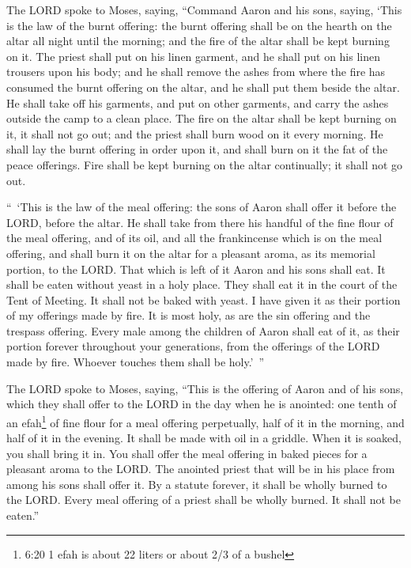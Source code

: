 \myverse{}The LORD spoke to Moses, saying,
\myverse{}“Command Aaron and his sons, saying, ‘This is the law of the burnt offering:
the burnt offering shall be on the hearth on the altar all night until the morning; and the fire of the
altar shall be kept burning on it.
\myverse{}The priest shall put on his linen garment, and he shall put on his linen trousers
upon his body; and he shall remove the ashes from where the fire has consumed the burnt offering on the
altar, and he shall put them beside the altar.
\myverse{}He shall take off his garments, and put on other garments, and carry the ashes
outside the camp to a clean place.
\myverse{}The fire on the altar shall be kept burning on it, it shall not go out; and
the priest shall burn wood on it every morning. He shall lay the burnt offering in order upon it, and
shall burn on it the fat of the peace offerings.
\myverse{}Fire shall be kept burning on the altar continually; it shall not go out.


\myverse{}“ ‘This is the law of the meal offering: the sons of Aaron shall
offer it before the LORD, before the altar.
\myverse{}He shall take from there his handful of the fine flour of the meal offering,
and of its oil, and all the frankincense which is on the meal offering, and shall burn it on the altar
for a pleasant aroma, as its memorial portion, to the LORD.
\myverse{}That which is left of it Aaron and his sons shall eat. It shall be eaten without
yeast in a holy place. They shall eat it in the court of the Tent of Meeting.
\myverse{}It shall not be baked with yeast. I have given it as their portion of my offerings
made by fire. It is most holy, as are the sin offering and the trespass offering.
\myverse{}Every male among the children of Aaron shall eat of it, as their portion forever
throughout your generations, from the offerings of the LORD made by fire. Whoever touches them shall be
holy.’ ”


\myverse{}The LORD spoke to Moses, saying,
\myverse{}“This is the offering of Aaron and of his sons, which they shall offer to
the LORD in the day when he is anointed: one tenth of an efah\footnote{6:20 1 efah is about 22 liters or about 2/3 of a bushel} of fine flour for a meal offering
perpetually, half of it in the morning, and half of it in the evening.
\myverse{}It shall be made with oil in a griddle. When it is soaked, you shall bring
it in. You shall offer the meal offering in baked pieces for a pleasant aroma to the LORD.
\myverse{}The anointed priest that will be in his place from among his sons shall offer
it. By a statute forever, it shall be wholly burned to the LORD.
\myverse{}Every meal offering of a priest shall be wholly burned. It shall not be eaten.”


